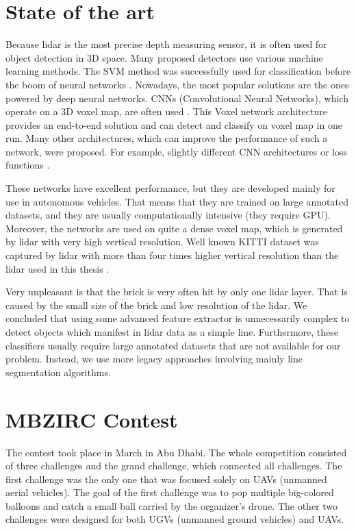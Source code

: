 \section{State of the art}
Because lidar is the most precise depth measuring sensor, it is often used for object detection in 3D space. Many proposed detectors use various machine learning methods. The SVM method was successfully used for classification before the boom of neural networks \cite{himmelsbach2008}. Nowadays, the most popular solutions are the ones powered by deep neural networks. CNNs (Convolutional Neural Networks), which operate on a 3D voxel map, are often used \cite{zhou2017}. This Voxel network architecture provides an end-to-end solution and can detect and classify on voxel map in one run. Many other architectures, which can improve the performance of such a network, were proposed. For example, slightly different CNN architectures or loss functions \cite{yan2018}. 

These networks have excellent performance, but they are developed mainly for use in autonomous vehicles. That means that they are trained on large annotated datasets, and they are usually computationally intensive (they require GPU). Moreover, the networks are used on quite a dense voxel map, which is generated by lidar with very high vertical resolution. Well known KITTI dataset was captured by lidar with more than four times higher vertical resolution than the lidar used in this thesis \cite{geiger2013}.

Very unpleasant is that the brick is very often hit by only one lidar layer. That is caused by the small size of the brick and low resolution of the lidar. We concluded that using some advanced feature extractor is unnecessarily complex to detect objects which manifest in lidar data as a simple line. Furthermore, these classifiers usually require large annotated datasets that are not available for our problem. Instead, we use more legacy approaches involving mainly line segmentation algorithms.

\section{MBZIRC Contest}
The contest took place in March in Abu Dhabi. The whole competition consisted of three challenges and the grand challenge, which connected all challenges. The first challenge was the only one that was focused solely on UAVs (unmanned aerial vehicles). The goal of the first challenge was to pop multiple big-colored balloons and catch a small ball carried by the organizer's drone. The other two challenges were designed for both UGVs (unmanned ground vehicles) and UAVs. 

